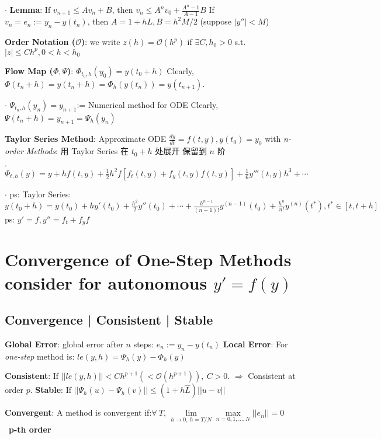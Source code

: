 \documentclass[9pt]{article}
\begin{document}
$\cdot$ \textbf{Lemma}: If $v_{n+1}\leq Av_n+B$, then $v_n\leq A^nv_0+\frac{A^n-1}{A-1}B$ \quad If $v_{n}=e_n:=y_n-y(t_n)$, then $A=1+hL,B=h^2M/2$ {\scriptsize (suppose $|y''|<M$)}

\textbf{Order Notation ($\mathcal{O}$)}: we write $z(h)=\mathcal{O}(h^p)$ if $\exists C,h_0>0$ s.t. $|z|\leq Ch^p,0<h<h_0$

\textbf{Flow Map ($\Phi,\Psi$)}: $\Phi_{t_0,h}(y_0)=y(t_0+h)$ \quad Clearly, $\Phi(t_n+h)=y(t_n+h)=\Phi_h(y(t_n))=y(t_{n+1})$.

$\cdot$ $\Psi_{t_n,h}(y_n)=y_{n+1}$:= Numerical method for ODE \quad Clearly, $\Psi(t_n+h)=y_{n+1}=\Psi_h(y_{n})$

\textbf{Taylor Series Method}: {\small Approximate ODE $\frac{dy}{dt}=f(t,y),y(t_0)=y_0$ with \textit{n-order Methods}: 用 Taylor Series 在 $t_0+h$ 处展开 保留到 $n$ 阶}

$\cdot$ $\Phi_{t,h}(y)=y+hf(t,y)+\frac{1}{2}h^2f[f_t(t,y)+f_y(t,y)f(t,y)]+\frac{1}{6}y'''(t,y)h^3+\cdots$

$\cdot$ ps: {\footnotesize Taylor Series: $y(t_0+h)=y(t_0)+hy'(t_0)+\frac{h^2}{2}y''(t_0)+\cdots+\frac{h^{n-1}}{(n-1)!}y^{(n-1)}(t_0)+\frac{h^n}{n!}y^{(n)}(t^*),t^*\in[t,t+h]$ \quad \quad  ps: $y'=f,y''=f_t+f_yf$}


\section{Convergence of One-Step Methods {\scriptsize consider for autonomous $y'=f(y)$}} %

\subsection{Convergence | Consistent | Stable} %
\textbf{Global Error}: global error after $n$ steps: $e_n:=y_n-y(t_n)$ \quad \textbf{Local Error}: {\small For \textit{one-step} method is: $le(y,h)=\Psi_h(y)-\Phi_h(y)$}

\textbf{Consistent}: {\small If $||le(y,h)||<Ch^{p+1} (<\mathcal{O}(h^{p+1})), \ C>0$. $\Rightarrow$ Consistent at order $p$.} \quad \textbf{Stable}: If $||\Psi_h(u)-\Psi_h(v)||\leq(1+h\widehat{L})||u-v||$

\textbf{Convergent}: {\small A method is convergent if:$\forall \ T$, $\lim\limits_{h\to0,\ h=T/N}\max\limits_{n=0,1,...,N}||e_n||=0$} \quad \quad {} \ {\tiny \textbf{p-th order}}
\end{document}
